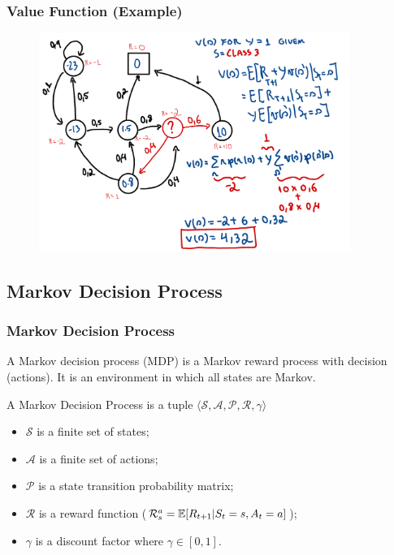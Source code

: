\begin{frame}
    \frametitle{Value Function (Example)}
    \begin{figure}
        \centering
        \includegraphics[width=0.9\textwidth]{sections/markov/figures/student_example_calc_v_s.pdf}
    \end{figure}
\end{frame}

\subsection{Markov Decision Process}

\begin{frame}
    \frametitle{Markov Decision Process}

    A Markov decision process (MDP) is a Markov reward process with decision (actions).
    It is an environment in which all states are Markov.

    \begin{definition}
        A Markov Decision Process is a tuple $\langle\mathcal{S},\mathcal{A},\mathcal{P},\mathcal{R},\gamma\rangle$
        \begin{itemize}
            \item $\mathcal{S}$ is a finite set of states;
            \item $\mathcal{A}$ is a finite {\color{red}set of actions};
            \item $\mathcal{P}$ is a state transition probability matrix;
            \item $\mathcal{R}$ is a reward function ($\mathcal{R}^{a}_{s}=\operatorname*{\mathbb{E}}[R_{t+1}|S_t=s,A_t=a]$);
            \item $\gamma$ is a discount factor where $\gamma\in[0,1]$.
        \end{itemize}
    \end{definition}
\end{frame}



